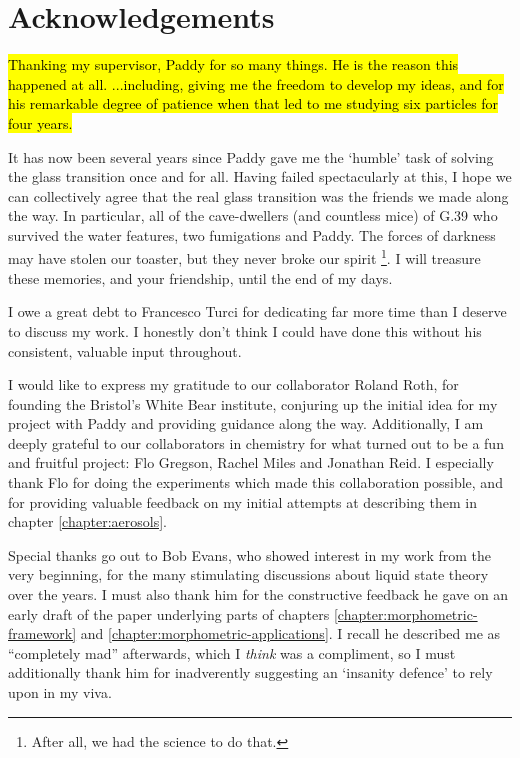 
\chapter*{Acknowledgements}

\hl{Thanking my supervisor, Paddy for so many things.
  He is the reason this happened at all.
  ...including, giving me the freedom to develop my ideas, and for his remarkable degree of patience when that led to me studying six particles for four years.}

It has now been several years since Paddy gave me the `humble' task of solving the glass transition once and for all.
Having failed spectacularly at this, I hope we can collectively agree that the real glass transition was the friends we made along the way.
In particular, all of the cave-dwellers (and countless mice) of G.39 who survived the water features, two fumigations and Paddy.
The forces of darkness may have stolen our toaster, but they never broke our spirit%
\footnote{After all, we had the science to do that.}.
I will treasure these memories, and your friendship, until the end of my days.

I owe a great debt to Francesco Turci for dedicating far more time than I deserve to discuss my work.
I honestly don't think I could have done this without his consistent, valuable input throughout.

I would like to express my gratitude to our collaborator Roland Roth, for founding the Bristol's White Bear institute, conjuring up the initial idea for my project with Paddy and providing guidance along the way.
Additionally, I am deeply grateful to our collaborators in chemistry for what turned out to be a fun and fruitful project: Flo Gregson, Rachel Miles and Jonathan Reid.
I especially thank Flo for doing the experiments which made this collaboration possible, and for providing valuable feedback on my initial attempts at describing them in chapter \ref{chapter:aerosols}.

Special thanks go out to Bob Evans, who showed interest in my work from the very beginning, for the many stimulating discussions about liquid state theory over the years.
I must also thank him for the constructive feedback he gave on an early draft of the paper underlying parts of chapters \ref{chapter:morphometric-framework} and \ref{chapter:morphometric-applications}.
I recall he described me as ``completely mad'' afterwards, which I \emph{think} was a compliment, so I must additionally thank him for inadverently suggesting an `insanity defence' to rely upon in my viva.

